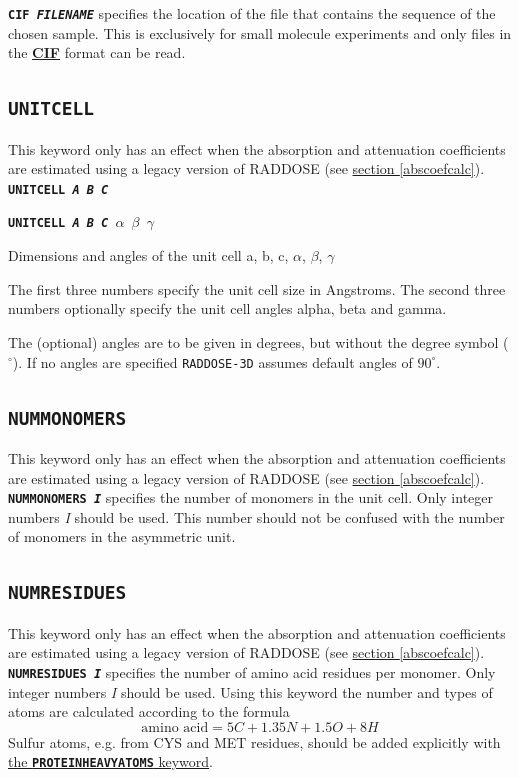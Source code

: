 \documentclass[a4paper]{article}
\newcommand{\RD}{\texttt{RADDOSE-3D}\xspace}
\newcommand{\Keyword}[1]{\texttt{\textbf{#1}}\xspace}
\newcommand{\SB}{\\[0.2em]}
\newcommand{\RDLegacyKeyword}{This keyword only has an effect when the absorption and attenuation coefficients are estimated using a legacy version of RADDOSE (see \hyperref[abscoefcalc]{section \ref*{abscoefcalc}}).\SB
}
\begin{document}
\Keyword{CIF \textit{FILENAME}} specifies the location of the file that contains the sequence of the chosen sample. This is exclusively for small molecule experiments and only files in the \href{https://en.wikipedia.org/wiki/Crystallographic_Information_File}{\textbf{CIF}} format can be read. \SB

\subsection{\Keyword{UNITCELL}}
\label{RDv3Start}
\label{unitcell}
\RDLegacyKeyword

\noindent \Keyword{UNITCELL \textit{A B C}}

\noindent \Keyword{UNITCELL \textit{A B C $\alpha$ $\beta$ $\gamma$}}

Dimensions and angles of the unit cell a, b, c, $\alpha$, $\beta$, $\gamma$

The first three numbers specify the unit cell size in Angstroms. The second three numbers optionally specify the unit cell angles alpha, beta and gamma.

The (optional) angles are to be given in degrees, but without the degree symbol ($^\circ$). If no angles are specified \RD assumes default angles of $90^\circ$.

\subsection{\Keyword{NUMMONOMERS}}
\label{nummonomers}
\RDLegacyKeyword

\noindent \Keyword{NUMMONOMERS \textit{I}}
specifies the number of monomers in the unit cell. Only integer numbers \textit{I} should be used. This number should not be confused with the number of monomers in the asymmetric unit.


\subsection{\Keyword{NUMRESIDUES}}
\label{numresidues}
\RDLegacyKeyword

\noindent \Keyword{NUMRESIDUES \textit{I}}
specifies the number of amino acid residues per monomer. Only integer numbers \textit{I} should be used. Using this keyword the number and types of atoms are calculated according to the formula
\[ \mbox{amino acid} = 5 C + 1.35 N + 1.5 O + 8 H \]
Sulfur atoms, e.g. from CYS and MET residues, should be added explicitly with \hyperref[proteinheavyatoms]{the \Keyword{PROTEINHEAVYATOMS} keyword}.
\end{document}
